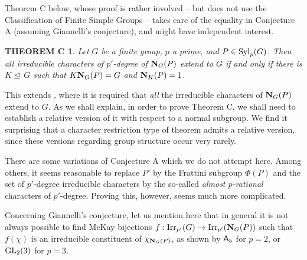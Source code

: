\documentclass[12pt]{amsart}
\theoremstyle{plain}
\theoremstyle{definition}
\newtheorem*{thmC}{THEOREM C}
\numberwithin{equation}{section}
\def\irrp#1{{\rm Irr}_{p'}(#1)}
\def\irr#1{{\rm Irr}(#1)}
\def\syl#1#2{{\rm Syl}_#1(#2)}
\def\nor{\trianglelefteq\,}
\def\norm#1#2{{\bf N}_{#1}(#2)}
\begin{document}
 Theorem C below, whose proof is rather involved -- but does not use the Classification of Finite Simple Groups -- takes care of the equality in Conjecture A (assuming Giannelli's conjecture), and
 might have independent interest.
%

\begin{thmC}
{\sl Let $G$ be a finite group, $p$ a prime, and $P\in \syl pG$.
Then all irreducible characters of $p'$-degree of $\norm GP$ extend
to $G$ if and only if there is $K\nor G$ such that $K\norm GP=G$ and
$\norm KP=1$.}
    \end{thmC}

This extends \cite[Theorem B]{IsCR}, where it is required that {\sl
all} the irreducible characters of $\norm GP$ extend to $G$. As we
shall explain, in order to prove Theorem C, we shall need to
establish a relative version of it with respect to a normal
subgroup. We find it surprising that a character restriction type of
theorem admits a  relative version, since these versions regarding
group structure  occur very rarely.



\smallskip
There are some variations of Conjecture A which we do not attempt
here. Among others, it seems reasonable to replace $P'$ by the
Frattini subgroup $\Phi(P)$ and the set of $p'$-degree irreducible
characters by the  so-called {\sl almost $p$-rational} characters of
$p'$-degree. Proving this, however, seems much more complicated.

\smallskip
Concerning Giannelli's conjecture, let us mention here that in
general it is not always possible to find McKay bijections $f: \irrp
G \rightarrow \irrp{\norm GP}$ such that $f(\chi)$ is an irreducible
constituent of $\chi_{\norm GP}$, as shown by ${\sf A}_5$ for $p=2$,
or ${\rm GL}_2(3)$ for $p=3$.


\smallskip
\end{document}
